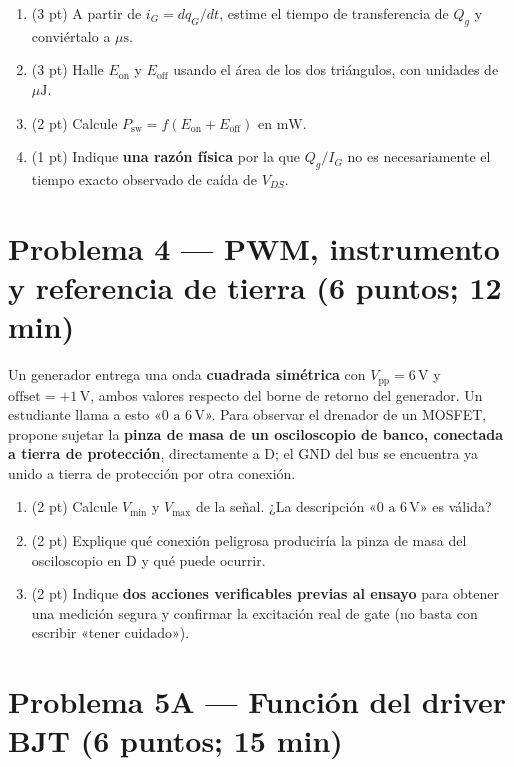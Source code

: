 \documentclass[11pt, a4paper]{article}
\begin{document}
\begin{enumerate}[label=\arabic*., noitemsep, topsep=2pt]
    \item (3 pt) A partir de $i_G = dq_G/dt$, estime el tiempo de transferencia de $Q_g$ y conviértalo a $\mu\text{s}$.
    \item (3 pt) Halle $E_{\text{on}}$ y $E_{\text{off}}$ usando el área de los dos triángulos, con unidades de $\mu\text{J}$.
    \item (2 pt) Calcule $P_{\text{sw}} = f(E_{\text{on}} + E_{\text{off}})$ en $\text{mW}$.
    \item (1 pt) Indique \textbf{una razón física} por la que $Q_g/I_G$ no es necesariamente el tiempo exacto observado de caída de $V_{DS}$.
\end{enumerate}

\section*{Problema 4 — PWM, instrumento y referencia de tierra (6 puntos; 12 min)}

Un generador entrega una onda \textbf{cuadrada simétrica} con $V_{\text{pp}} = 6\,\text{V}$ y $\text{offset} = +1\,\text{V}$, ambos valores respecto del borne de retorno del generador. Un estudiante llama a esto «$0\text{ a }6\,\text{V}$». Para observar el drenador de un MOSFET, propone sujetar la \textbf{pinza de masa de un osciloscopio de banco, conectada a tierra de protección}, directamente a D; el GND del bus se encuentra ya unido a tierra de protección por otra conexión.

\begin{enumerate}[label=\arabic*., noitemsep, topsep=3pt]
    \item (2 pt) Calcule $V_{\min}$ y $V_{\max}$ de la señal. ¿La descripción «$0\text{ a }6\,\text{V}$» es válida?
    \item (2 pt) Explique qué conexión peligrosa produciría la pinza de masa del osciloscopio en D y qué puede ocurrir.
    \item (2 pt) Indique \textbf{dos acciones verificables previas al ensayo} para obtener una medición segura y confirmar la excitación real de gate (no basta con escribir «tener cuidado»).
\end{enumerate}

\section*{Problema 5A — Función del driver BJT (6 puntos; 15 min)}
\end{document}
